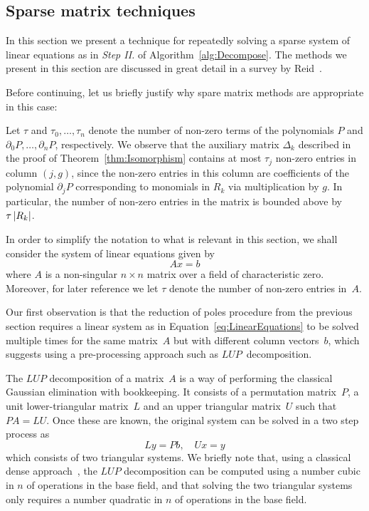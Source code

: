 
\subsection{Sparse matrix techniques}
\label{sec:01-04-sparse}

In this section we present a technique for repeatedly solving a sparse 
system of linear equations as in {\it Step II.} of 
Algorithm~\ref{alg:Decompose}.  The methods we present in this section are 
discussed in great detail in a survey by Reid~\citep{Rei76}.

Before continuing, let us briefly justify why spare matrix methods are 
appropriate in this case:

\begin{rem}
Let $\tau$ and $\tau_0, \dotsc, \tau_n$ denote the number of non-zero 
terms of the polynomials $P$ and $\partial_0 P, \dotsc, \partial_n P$, 
respectively.  We observe that the auxiliary matrix $\Delta_k$ described in 
the proof of Theorem~\ref{thm:Isomorphism} contains at most $\tau_j$ 
non-zero entries in column $(j, g)$, since the non-zero entries in this column 
are coefficients of the polynomial $\partial_j P$ corresponding to monomials 
in $R_k$ via multiplication by $g$.  In particular, the number of non-zero 
entries in the matrix is bounded above by $\tau \left\lvert R_k\right\rvert$.
\end{rem}

\begin{notation}
In order to simplify the notation to what is relevant in this section, we 
shall consider the system of linear equations given by 
\begin{equation} \label{eq:LinearEquations}
A x = b
\end{equation}
where $A$ is a non-singular $n \times n$ matrix over a field of characteristic 
zero.  Moreover, for later reference we let $\tau$ denote the number of 
non-zero entries in~$A$.
\end{notation}

Our first observation is that the reduction of poles procedure from the 
previous section requires a linear system as in 
Equation~\eqref{eq:LinearEquations} to be solved multiple times for the same 
matrix~$A$ but with different column vectors~$b$, which suggests using a 
pre-processing approach such as $LUP$~decomposition.

The $LUP$ decomposition of a matrix~$A$ is a way of performing the 
classical Gaussian elimination with bookkeeping.  It consists of a 
permutation matrix~$P$, a unit lower-triangular matrix~$L$ and an upper 
triangular matrix~$U$ such that $PA = LU$.  Once these are known, the 
original system can be solved in a two step process as
\begin{equation}
L y = P b, \quad U x = y
\end{equation}
which consists of two triangular systems.  We briefly note that, using a 
classical dense approach~\citep{Cor90}, the $LUP$ decomposition can be 
computed using a number cubic in $n$ of operations in the base field, and 
that solving the two triangular systems only requires a number quadratic in 
$n$ of operations in the base field.

